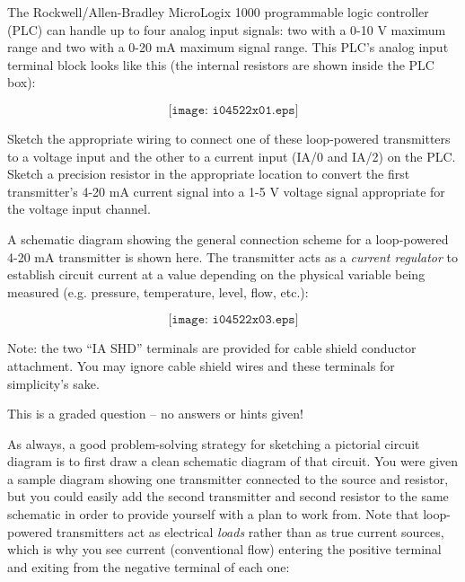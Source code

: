

The Rockwell/Allen-Bradley MicroLogix 1000 programmable logic controller (PLC) can handle up to four analog input signals: two with a 0-10 V maximum range and two with a 0-20 mA maximum signal range.  This PLC's analog input terminal block looks like this (the internal resistors are shown inside the PLC box):

$$\texttt{[image: i04522x01.eps]}$$

Sketch the appropriate wiring to connect one of these loop-powered transmitters to a voltage input and the other to a current input (IA/0 and IA/2) on the PLC.  Sketch a precision resistor in the appropriate location to convert the first transmitter's 4-20 mA current signal into a 1-5 V voltage signal appropriate for the voltage input channel.

\vskip 10pt

A schematic diagram showing the general connection scheme for a loop-powered 4-20 mA transmitter is shown here.  The transmitter acts as a {\it current regulator} to establish circuit current at a value depending on the physical variable being measured (e.g. pressure, temperature, level, flow, etc.):

$$\texttt{[image: i04522x03.eps]}$$

\vfil 

Note: the two ``IA SHD'' terminals are provided for cable shield conductor attachment.  You may ignore cable shield wires and these terminals for simplicity's sake.

\eject






This is a graded question -- no answers or hints given!
 






As always, a good problem-solving strategy for sketching a pictorial circuit diagram is to first draw a clean schematic diagram of that circuit.  You were given a sample diagram showing one transmitter connected to the source and resistor, but you could easily add the second transmitter and second resistor to the same schematic in order to provide yourself with a plan to work from.  Note that loop-powered transmitters act as electrical {\it loads} rather than as true current sources, which is why you see current (conventional flow) entering the positive terminal and exiting from the negative terminal of each one:

